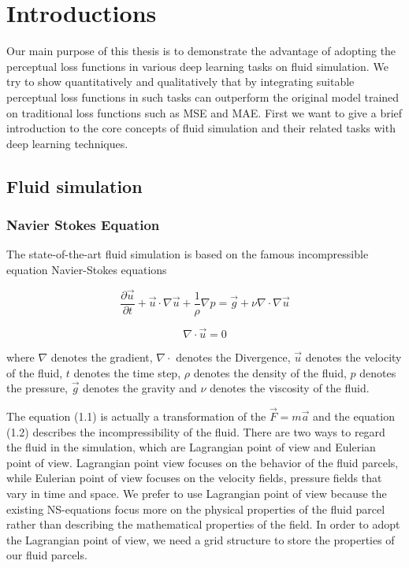 \documentclass[a4paper,12pt,twoside]{report}
\begin{document}

\chapter{Introductions}

Our main purpose of this thesis is to demonstrate the advantage of adopting the perceptual loss functions in various deep learning tasks on fluid simulation. We try to show quantitatively and qualitatively that by integrating suitable perceptual loss functions in such tasks can outperform the original model trained on traditional loss functions such as MSE and MAE.  First we want to give a brief introduction to the core concepts of fluid simulation and their related tasks with deep learning techniques.
\section{Fluid simulation}
\subsection{Navier Stokes Equation}
The state-of-the-art fluid simulation is based on the famous incompressible equation Navier-Stokes equations

\begin{equation}
\frac{\partial \vec u}{\partial t}+\vec u\cdot \nabla\vec u+\frac1\rho\nabla p = \vec g + \nu\nabla\cdot\nabla\vec{u}
\end{equation}

\begin{equation}
{\nabla}\cdot\vec{u} = 0
\end{equation}

where $\nabla$ denotes the gradient, $\nabla\cdot$ denotes the Divergence, $\vec{u}$ denotes the velocity of the fluid, $t$ denotes the time step, $\rho$ denotes the density of the fluid, $p$ denotes the pressure, $\vec{g}$ denotes the gravity and $\nu$ denotes the viscosity of the fluid.

The equation (1.1) is actually a transformation of the $\vec{F} = m\vec{a}$ and the equation (1.2) describes the incompressibility of the fluid. There are two ways to regard the fluid in the simulation, which are Lagrangian point of view and Eulerian point of  view. Lagrangian point view focuses on the behavior of the fluid parcels, while Eulerian point of view focuses on the velocity fields, pressure fields that vary in time and space. We prefer to use Lagrangian point of view because the existing NS-equations focus more on the physical properties of the fluid parcel rather than describing the mathematical properties of the field.  In order to adopt the Lagrangian point of view, we need a grid structure to store the properties of our fluid parcels.
\end{document}
